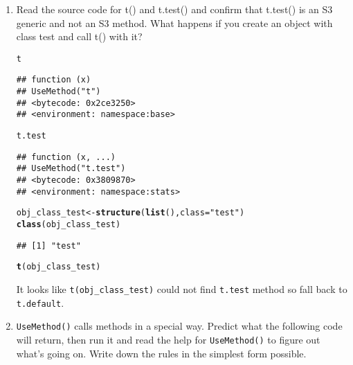 \documentclass{article}\usepackage[]{graphicx}\usepackage[]{color}
\makeatletter
\newcommand{\hlstr}[1]{\textcolor[rgb]{0.192,0.494,0.8}{#1}}%
\newcommand{\hlstd}[1]{\textcolor[rgb]{0.345,0.345,0.345}{#1}}%
\newcommand{\hlkwb}[1]{\textcolor[rgb]{0.69,0.353,0.396}{#1}}%
\newcommand{\hlkwc}[1]{\textcolor[rgb]{0.333,0.667,0.333}{#1}}%
\newcommand{\hlkwd}[1]{\textcolor[rgb]{0.737,0.353,0.396}{\textbf{#1}}}%
\newenvironment{kframe}{%
 \def\at@end@of@kframe{}%
 \ifinner\ifhmode%
  \def\at@end@of@kframe{\end{minipage}}%
  \begin{minipage}{\columnwidth}%
 \fi\fi%
 \def\FrameCommand##1{\hskip\@totalleftmargin \hskip-\fboxsep
 \colorbox{shadecolor}{##1}\hskip-\fboxsep
     \hskip-\linewidth \hskip-\@totalleftmargin \hskip\columnwidth}%
 \MakeFramed {\advance\hsize-\width
   \@totalleftmargin\z@ \linewidth\hsize
   \@setminipage}}%
 {\par\unskip\endMakeFramed%
 \at@end@of@kframe}
\newenvironment{knitrout}{}{} %
\makeatother
\begin{document}
\begin{enumerate}
\item Read the source code for t() and t.test() and confirm that t.test() is an S3 generic and not an S3 method. What happens if you create an object with class test and call t() with it?

\begin{knitrout}
\color{fgcolor}\begin{kframe}
\begin{alltt}
\hlstd{t}
\end{alltt}
\begin{verbatim}
## function (x) 
## UseMethod("t")
## <bytecode: 0x2ce3250>
## <environment: namespace:base>
\end{verbatim}
\begin{alltt}
\hlstd{t.test}
\end{alltt}
\begin{verbatim}
## function (x, ...) 
## UseMethod("t.test")
## <bytecode: 0x3809870>
## <environment: namespace:stats>
\end{verbatim}
\begin{alltt}
\hlstd{obj_class_test} \hlkwb{<-} \hlkwd{structure}\hlstd{(}\hlkwd{list}\hlstd{(),} \hlkwc{class}\hlstd{=}\hlstr{"test"}\hlstd{)}
\hlkwd{class}\hlstd{(obj_class_test)}
\end{alltt}
\begin{verbatim}
## [1] "test"
\end{verbatim}
\begin{alltt}
\hlkwd{t}\hlstd{(obj_class_test)}
\end{alltt}


{\ttfamily\noindent\color{warningcolor}{\#\# Warning: argument is not numeric or logical: returning NA}}

{\ttfamily\noindent\bfseries\color{errorcolor}{\#\# Error: is.atomic(x) is not TRUE}}\end{kframe}
\end{knitrout}

It looks like \verb`t(obj_class_test)` could not find \verb`t.test` method so fall back to \verb`t.default`.

\item \verb`UseMethod()` calls methods in a special way. Predict what the following code will return, then run it and read the help for \verb`UseMethod()` to figure out what’s going on. Write down the rules in the simplest form possible.


\end{enumerate}
\end{document}
